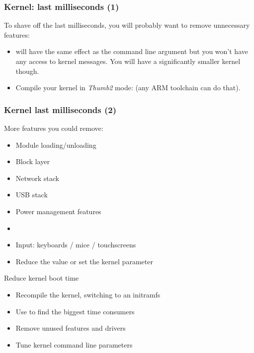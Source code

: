 \begin{frame}
\frametitle{Kernel: last milliseconds (1)}
To shave off the last milliseconds, you will probably want to remove
unnecessary features:
\begin{itemize}
        \item {} will have the same effect as the
               command line argument but you won't have
	      any access to kernel messages. You will have a
              significantly smaller kernel though.
	\item Compile your kernel in {\em Thumb2} mode:
	       (any ARM toolchain can do
	      that).
\end{itemize}
\end{frame}

\begin{frame}
\frametitle{Kernel last milliseconds (2)}
More features you could remove:
\begin{itemize}
        \item Module loading/unloading
        \item Block layer
        \item Network stack
        \item USB stack
        \item Power management features
        \item {}
        \item Input: keyboards / mice / touchscreens
        \item Reduce the  value or set the
               kernel parameter
\end{itemize}
\end{frame}

\setuplabframe
{Reduce kernel boot time}
{
\begin{itemize}
\item Recompile the kernel, switching to an initramfs
\item Use  to find the biggest
      time consumers
\item Remove unused features and drivers
\item Tune kernel command line parameters
\end{itemize}
}

